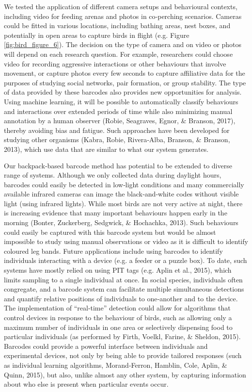 \documentclass[11pt,a4paper,oneside]{book}
\begin{document}
\begin{doublespace}
We tested the application of different camera setups and behavioural contexts, including video for feeding arenas and photos in co‐perching scenarios. Cameras could be fitted in various locations, including bathing areas, nest boxes, and potentially in open areas to capture birds in flight (e.g. Figure \ref{fig:bird_figure_6}). The decision on the type of camera and on video or photos will depend on each research question. For example, researchers could choose video for recording aggressive interactions or other behaviours that involve movement, or capture photos every few seconds to capture affiliative data for the purposes of studying social networks, pair formation, or group stability. The type of data provided by these barcodes also provides new opportunities for analysis. Using machine learning, it will be possible to automatically classify behaviours and interactions over extended periods of time while also minimizing manual annotation by a human observer (Robie, Seagraves, Egnor, \& Branson, 2017), thereby avoiding bias and fatigue. Such approaches have been developed for studying other organisms (Kabra, Robie, Rivera‐Alba, Branson, \& Branson, 2013), which use data that are similar to what our system generates.

Our backpack‐based barcode method has potential to be extended to diverse range of systems. Although we only collected data during daylight hours, barcodes could easily be detected in low‐light conditions and many commercially available infrared cameras can image the black‐and‐white codes without visible light (using infrared lights). While most birds are not very active at night, there is increasing evidence that many important behaviours happen early in the morning (Bonter, Zuckerberg, Sedgwick, \& Hochachka, 2013). Such behaviours could easily be captured with this barcode system but would be almost impossible to study using manual observations or video as it is difficult to identify coloured leg bands. Future applications include using barcodes to identify individuals interacting with a device (e.g. a feeder or a puzzle box). To date, such systems have mostly relied on using PIT tags (e.g. Aplin et al., 2015), which limits sampling to a single individual at once. In social species, individuals often congregate, and a barcode system can facilitate multiple simultaneous detections and quantify relative positions of individuals to one‐another and to the device. The implementation of “real‐time” detection could allow for algorithms that control devices in response to the behaviour of birds, such as allowing only a maximum number of individuals in one area or selectively dispensing food to particular individuals (as performed by Firth, Voelkl, Farine, \& Sheldon, 2015). Barcodes could provide a powerful interface between individuals and experimental devices, not only by being able to provide tailored responses (such as individual learning algorithms, Morand‐Ferron, Hamblin, Cole, Aplin, \& Quinn, 2015), but also, unlike almost any other system, by capturing information about who else is present when particular events occur.


\end{doublespace}
\end{document}
